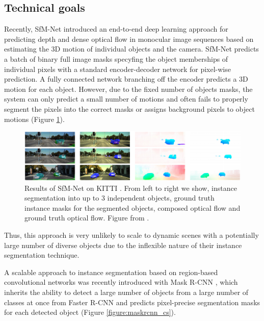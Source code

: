 \subsection{Technical goals}

Recently, SfM-Net \cite{SfmNet} introduced an end-to-end deep learning approach for predicting depth
and dense optical flow in monocular image sequences based on estimating the 3D motion of individual objects and the camera.
SfM-Net predicts a batch of binary full image masks specyfing the object memberships of individual pixels with a standard encoder-decoder
network for pixel-wise prediction. A fully connected network branching off the encoder predicts a 3D motion for each object.
However, due to the fixed number of objects masks, the system can only predict a small number of motions and
often fails to properly segment the pixels into the correct masks or assigns background pixels to object motions (Figure \ref{figure:sfmnet_kitti}).
\begin{figure}[t]
  \centering
  \includegraphics[width=\textwidth]{figures/sfmnet_kitti}
\caption{
Results of SfM-Net \cite{SfmNet} on KITTI \cite{KITTI2015}.
From left to right we show, instance segmentation into up to 3 independent objects,
ground truth instance masks for the segmented objects, composed optical flow and ground truth optical flow.
Figure from \cite{SfmNet}.
}
\label{figure:sfmnet_kitti}
\end{figure}
Thus, this approach is very unlikely to scale to dynamic scenes with a potentially
large number of diverse objects due to the inflexible nature of their instance segmentation technique.

A scalable approach to instance segmentation based on region-based convolutional networks
was recently introduced with Mask R-CNN \cite{MaskRCNN}, which inherits the ability to detect
a large number of objects from a large number of classes at once from Faster R-CNN
and predicts pixel-precise segmentation masks for each detected object (Figure \ref{figure:maskrcnn_cs}).

